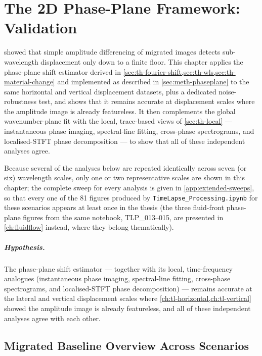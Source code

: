 \chapter{The 2D Phase-Plane Framework: Validation}
\label{ch:phase-plane}

 showed that simple amplitude
differencing of migrated images detects sub-wavelength displacement only down
to a finite floor. This chapter applies the phase-plane shift estimator
derived in \cref{sec:th-fourier-shift,sec:th-wls,sec:th-material-change} and
implemented as described in \cref{sec:meth-phaseplane} to the same horizontal
and vertical displacement datasets, plus a dedicated noise-robustness test,
and shows that it remains accurate at displacement scales where the amplitude
image is already featureless. It then complements the global wavenumber-plane
fit with the local, trace-based views of \cref{sec:th-local} ---
instantaneous phase imaging, spectral-line fitting, cross-phase
spectrograms, and localised-STFT phase decomposition --- to show that all of
these independent analyses agree.

Because several of the analyses below are repeated identically across seven
(or six) wavelength scales, only one or two representative scales are shown
in this chapter; the complete sweep for every analysis is given in
\cref{app:extended-sweeps}, so that every one of the 81 figures produced by
\texttt{TimeLapse\_Processing.ipynb} for these scenarios appears at least
once in the thesis (the three fluid-front phase-plane figures from the same
notebook, TLP\_013--015, are presented in \cref{ch:fluidflow} instead, where
they belong thematically).

\paragraph{Hypothesis.} The phase-plane shift estimator --- together with its
local, time-frequency analogues (instantaneous phase imaging, spectral-line
fitting, cross-phase spectrograms, and localised-STFT phase decomposition)
--- remains accurate at the lateral and vertical displacement scales where
\cref{ch:tl-horizontal,ch:tl-vertical} showed the amplitude image is already
featureless, and all of these independent analyses agree with each other.

\section{Migrated Baseline Overview Across Scenarios}
\label{sec:tlp-overview}


